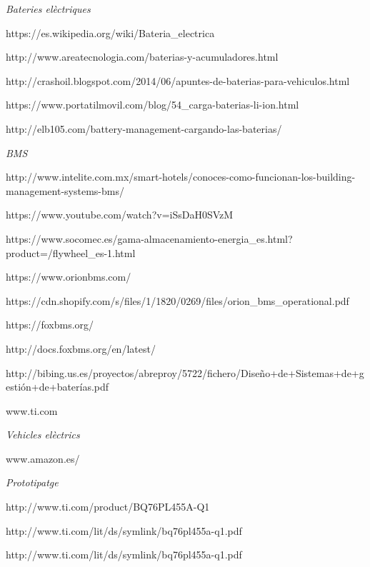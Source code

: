 
\begin{thebibliography}{X}
\textit{Bateries elèctriques}

https://es.wikipedia.org/wiki/Bateria\_electrica

http://www.areatecnologia.com/baterias-y-acumuladores.html

http://crashoil.blogspot.com/2014/06/apuntes-de-baterias-para-vehiculos.html

https://www.portatilmovil.com/blog/54\_carga-baterias-li-ion.html

http://elb105.com/battery-management-cargando-las-baterias/

\textit{BMS}

http://www.intelite.com.mx/smart-hotels/conoces-como-funcionan-los-building-management-systems-bms/

https://www.youtube.com/watch?v=iSsDaH0SVzM

https://www.socomec.es/gama-almacenamiento-energia\_es.html?product=/flywheel\_es-1.html

https://www.orionbms.com/

https://cdn.shopify.com/s/files/1/1820/0269/files/\newline orion\_bms\_operational.pdf

https://foxbms.org/

http://docs.foxbms.org/en/latest/

http://bibing.us.es/proyectos/abreproy/5722/fichero/\newline Diseño+de+Sistemas+de+gestión+de+baterías.pdf

www.ti.com

\textit{Vehicles elèctrics}

www.amazon.es/

\textit{Prototipatge}

http://www.ti.com/product/BQ76PL455A-Q1

http://www.ti.com/lit/ds/symlink/bq76pl455a-q1.pdf

http://www.ti.com/lit/ds/symlink/bq76pl455a-q1.pdf

\end{thebibliography}

